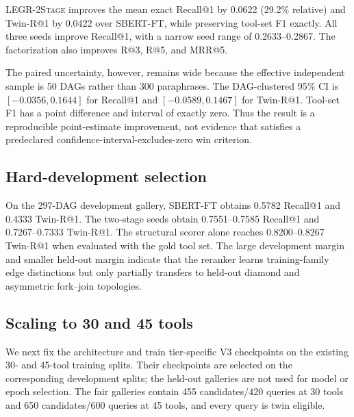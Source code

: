 \documentclass{article}
\newcommand{\method}{\textsc{LEGR-2Stage}}
\newcommand{\sbert}{\textsc{SBERT-FT}}
\begin{document}
\method{} improves the mean exact Recall@1 by 0.0622 (29.2\% relative) and Twin-R@1 by 0.0422 over \sbert{}, while preserving tool-set F1 exactly.
All three seeds improve Recall@1, with a narrow seed range of 0.2633--0.2867.
The factorization also improves R@3, R@5, and MRR@5.

The paired uncertainty, however, remains wide because the effective independent sample is 50 DAGs rather than 300 paraphrases.
The DAG-clustered 95\% CI is $[-0.0356,0.1644]$ for Recall@1 and $[-0.0589,0.1467]$ for Twin-R@1.
Tool-set F1 has a point difference and interval of exactly zero.
Thus the result is a reproducible point-estimate improvement, not evidence that satisfies a predeclared confidence-interval-excludes-zero win criterion.

\subsection{Hard-development selection}

On the 297-DAG development gallery, \sbert{} obtains 0.5782 Recall@1 and 0.4333 Twin-R@1.
The two-stage seeds obtain 0.7551--0.7585 Recall@1 and 0.7267--0.7333 Twin-R@1.
The structural scorer alone reaches 0.8200--0.8267 Twin-R@1 when evaluated with the gold tool set.
The large development margin and smaller held-out margin indicate that the reranker learns training-family edge distinctions but only partially transfers to held-out diamond and asymmetric fork--join topologies.

\subsection{Scaling to 30 and 45 tools}

We next fix the architecture and train tier-specific V3 checkpoints on the existing 30- and 45-tool training splits.
Their checkpoints are selected on the corresponding development splits; the held-out galleries are not used for model or epoch selection.
The fair galleries contain 455 candidates/420 queries at 30 tools and 650 candidates/600 queries at 45 tools, and every query is twin eligible.
\end{document}

